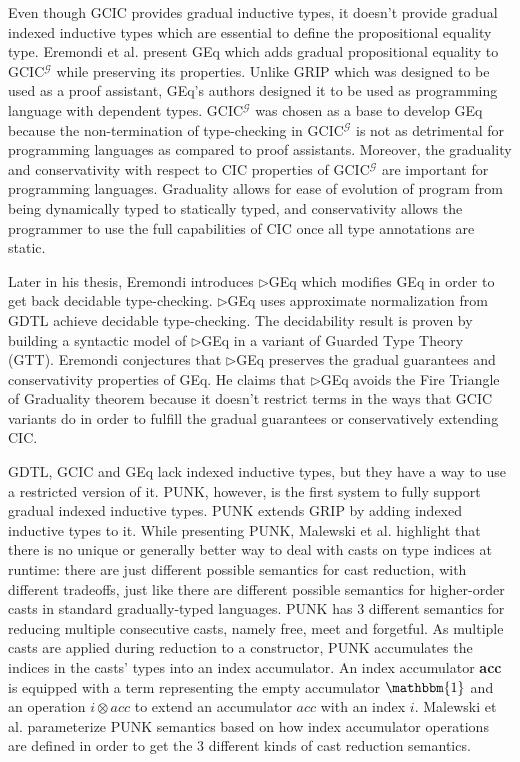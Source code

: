 \documentclass{article}
\newcommand{\Ccode}[1]{{\color{BlueViolet}\textbf{#1}}}
\newcommand{\GCICG}[0]{GCIC\(^\mathcal{G}\)}
\newcommand{\GGEq}[0]{\(\triangleright\)GEq}
\begin{document}
Even though GCIC provides gradual inductive types, it doesn't provide gradual
indexed inductive types which are essential to define the propositional equality
type. Eremondi et al. present GEq\cite{eremondi_propositional_2022} which adds
gradual propositional equality to \GCICG{} while preserving its properties.
Unlike GRIP which was designed to be used as a proof assistant, GEq's authors
designed it to be used as programming language with dependent types. \GCICG{}
was chosen as a base to develop GEq because the non-termination of type-checking
in \GCICG{} is not as detrimental for programming languages as compared to proof
assistants. Moreover, the graduality and conservativity with respect to CIC
properties of \GCICG{} are important for programming languages. Graduality
allows for ease of evolution of program from being dynamically typed to
statically typed, and conservativity allows the programmer to use the full
capabilities of CIC once all type annotations are static.

Later in his thesis\cite{eremondi_design_2023}, Eremondi introduces \GGEq{}
which modifies GEq in order to get back decidable type-checking. \GGEq{} uses
approximate normalization from GDTL achieve decidable type-checking. The
decidability result is proven by building a syntactic model of \GGEq{} in a
variant of Guarded Type Theory (GTT). Eremondi conjectures that \GGEq{}
preserves the gradual guarantees and conservativity properties of GEq. He claims
that \GGEq{} avoids the Fire Triangle of Graduality theorem because it doesn't
restrict terms in the ways that GCIC variants do in order to fulfill the gradual
guarantees or conservatively extending CIC.

GDTL, GCIC and GEq lack indexed inductive types, but they have a way to use a
restricted version of it. PUNK, however, is the first system to fully support
gradual indexed inductive types\cite{malewski_gradual_2024}. PUNK extends GRIP
by adding indexed inductive types to it. While presenting PUNK, Malewski et al.
highlight that there is no unique or generally better way to deal with casts on
type indices at runtime: there are just different possible semantics for cast
reduction, with different tradeoffs, just like there are different possible
semantics for higher-order casts in standard gradually-typed
languages\cite{siek_exploring_2009}. PUNK has 3 different semantics for reducing
multiple consecutive casts, namely free, meet and forgetful. As multiple casts
are applied during reduction to a constructor, PUNK accumulates the indices in
the casts' types into an index accumulator. An index accumulator \Ccode{acc} is
equipped with a term representing the empty accumulator \Ccode{\(\mathbbm{1}\)}
and an operation \(i \otimes\)\Ccode{\(acc\)} to extend an accumulator
\Ccode{\(acc\)} with an index \(i\). Malewski et al. parameterize PUNK
semantics based on how index accumulator operations are defined in order to get
the 3 different kinds of cast reduction semantics.
\end{document}
